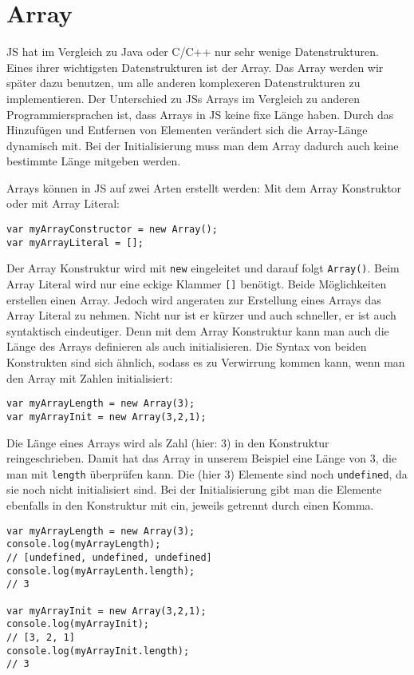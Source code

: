 \documentclass[babel]{book}
\begin{document}
\section{Array}
JS hat im Vergleich zu Java oder C/C++ nur sehr wenige Datenstrukturen. Eines ihrer wichtigsten Datenstrukturen ist der Array. Das Array werden wir später dazu benutzen, um alle anderen komplexeren Datenstrukturen zu implementieren. Der Unterschied zu JSs Arrays im Vergleich zu anderen Programmiersprachen ist, dass Arrays in JS keine fixe Länge haben. Durch das Hinzufügen und Entfernen von Elementen verändert sich die Array-Länge dynamisch mit. Bei der Initialisierung muss man dem Array dadurch auch keine bestimmte Länge mitgeben werden.

Arrays können in JS auf zwei Arten erstellt werden: Mit dem Array Konstruktor oder mit Array Literal:
\begin{lstlisting}[caption=Array Konstruktor]
var myArrayConstructor = new Array();
var myArrayLiteral = [];
\end{lstlisting}

Der Array Konstruktur wird mit \lstinline|new| eingeleitet und darauf folgt \lstinline|Array()|. Beim Array Literal wird nur eine eckige Klammer \lstinline|[]| benötigt. Beide Möglichkeiten erstellen einen Array. Jedoch wird angeraten zur Erstellung eines Arrays das Array Literal zu nehmen. Nicht nur ist er kürzer und auch schneller, er ist auch syntaktisch eindeutiger. Denn mit dem Array Konstruktur kann man auch die Länge des Arrays definieren als auch initialisieren. Die Syntax von beiden Konstrukten sind sich ähnlich, sodass es zu Verwirrung kommen kann, wenn man den Array mit Zahlen initialisiert:

\begin{lstlisting}[caption=Array Konstruktor]
var myArrayLength = new Array(3);
var myArrayInit = new Array(3,2,1);
\end{lstlisting}

Die Länge eines Arrays wird als Zahl (hier: 3) in den Konstruktur reingeschrieben. Damit hat das Array in unserem Beispiel eine Länge von 3, die man mit \lstinline|length| überprüfen kann. Die (hier 3) Elemente sind noch \lstinline|undefined|, da sie noch nicht initialisiert sind. Bei der Initialisierung gibt man die Elemente ebenfalls in den Konstruktur mit ein, jeweils getrennt durch einen Komma. 
\begin{lstlisting}[caption=Array Konstruktor]
var myArrayLength = new Array(3);
console.log(myArrayLength); 
// [undefined, undefined, undefined]
console.log(myArrayLenth.length); 
// 3

var myArrayInit = new Array(3,2,1);
console.log(myArrayInit); 
// [3, 2, 1]
console.log(myArrayInit.length); 
// 3
\end{lstlisting}
\end{document}
